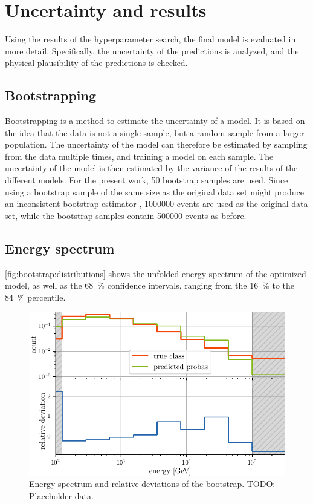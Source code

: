 \section{Uncertainty and results}
Using the results of the hyperparameter search,
the final model is evaluated in more detail.
Specifically,
  the uncertainty of the predictions is analyzed, %
  and the physical plausibility of the predictions is checked.


\subsection{Bootstrapping}
Bootstrapping \cite{bootstrap} is a method to estimate the uncertainty of a model.
It is based on the idea that the data is not a single sample,
but a random sample from a larger population.
The uncertainty of the model can therefore be estimated by sampling from the data multiple times,
and training a model on each sample.
The uncertainty of the model is then estimated by the variance of the results of the different models.
%
For the present work, \num{50} bootstrap samples are used. %
Since using a bootstrap sample of the same size as the original data set
might produce an inconsistent bootstrap estimator \cite{bootstrap_samplesize},
\num{1000000} events are used as the original data set,
while the bootstrap samples contain \num{500000} events as before.


\subsection{Energy spectrum}
\autoref{fig:bootstrap:distributions} shows the unfolded energy spectrum of the optimized model,
as well as the \SI{68}{\percent} confidence intervals,
  ranging from the \SI{16}{\percent} to the \SI{84}{\percent} percentile.

\blindtext[2]

\begin{figure}
  \centering
  \includegraphics[scale=1]{content/plots/bootstrap:spectrum.pdf}
  \caption{
    Energy spectrum and relative deviations of the bootstrap.
    TODO: Placeholder data.
  }
  \label{fig:bootstrap:spectrum}
\end{figure}


